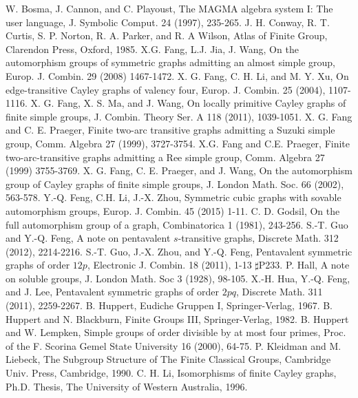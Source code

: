 \documentclass[12pt]{article}
\begin{document}
\begin{thebibliography}{99}
W. Bosma, J. Cannon, and C. Playoust, The MAGMA algebra system I: The user language, J. Symbolic Comput. 24 (1997), 235-265.
J. H. Conway, R. T. Curtis, S. P. Norton, R. A. Parker, and R. A Wilson, Atlas of Finite Group,
Clarendon Press, Oxford, 1985.
X.G. Fang, L.J. Jia, J. Wang, On the automorphism groups of symmetric graphs admitting an almost simple group,
Europ. J. Combin. 29 (2008) 1467-1472.
X. G. Fang, C. H. Li, and M. Y. Xu, On edge-transitive Cayley graphs of valency four,
Europ. J. Combin. 25 (2004), 1107-1116.
X. G. Fang, X. S. Ma, and J. Wang, On locally primitive Cayley graphs of finite simple groups,
J. Combin. Theory Ser. A 118 (2011), 1039-1051.
X. G. Fang and C. E. Praeger, Finite two-arc transitive graphs admitting a Suzuki simple group, Comm. Algebra 27 (1999), 3727-3754.
X.G. Fang and C.E. Praeger, Finite two-arc-transitive graphs admitting a Ree simple group, Comm. Algebra 27 (1999) 3755-3769.
X. G. Fang, C. E. Praeger, and J. Wang, On the automorphism group of Cayley graphs of finite simple groups, J. London Math. Soc. 66 (2002), 563-578.
Y.-Q. Feng, C.H. Li, J.-X. Zhou, Symmetric cubic graphs with sovable automorphism groups, Europ. J. Combin. 45 (2015) 1-11.
C. D. Godsil, On the full automorphism group of a graph,
Combinatorica 1 (1981), 243-256.
S.-T. Guo and Y.-Q. Feng, A note on pentavalent $s$-transitive graphs,
Discrete Math. 312 (2012), 2214-2216.
S.-T. Guo, J.-X. Zhou, and Y.-Q. Feng, Pentavalent symmetric graphs of order $12p$,
Electronic J. Combin. 18 (2011), 1-13 $\sharp$P233.
P. Hall, A note on soluble groups,
J. London Math. Soc 3 (1928), 98-105.
X.-H. Hua, Y.-Q. Feng, and J. Lee, Pentavalent symmetric graphs of order $2pq$,
Discrete Math. 311 (2011), 2259-2267.
B. Huppert, Eudiche Gruppen I, Springer-Verlag, 1967.
B. Huppert and N. Blackburn, Finite Groups III, Springer-Verlag, 1982.
B. Huppert and W. Lempken, Simple groups of order divisible by at most four primes,
Proc. of the F. Scorina Gemel State University 16 (2000), 64-75.
P. Kleidman and M. Liebeck, The Subgroup Structure of The Finite Classical Groups,
Cambridge Univ. Press, Cambridge, 1990.
C. H. Li, Isomorphisms of finite Cayley graphs,
Ph.D. Thesis, The University of Western Australia, 1996.

\end{thebibliography}
\end{document}
